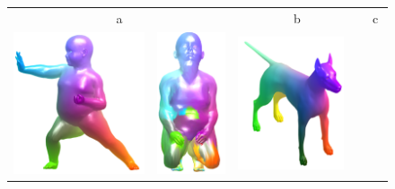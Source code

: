 \documentclass[10pt,twocolumn,letterpaper]{article}
\begin{document}
\begin{figure}[htb]
	\centering
\setlength\tabcolsep{0.5pt}
\begin{tabular}{cccccc}
	
	\multicolumn{2}{c}{a} & 	\multicolumn{2}{c}{b} & \multicolumn{2}{c}{c} \\ 
	\includegraphics[scale=0.7]{figures/FailTopBase.png} &
	\includegraphics[scale=0.7]{figures/FailTopmatch.png} &
	\includegraphics[scale=0.7]{figures/FailHolesbase.png} &

\end{tabular}
\end{figure}
\end{document}
